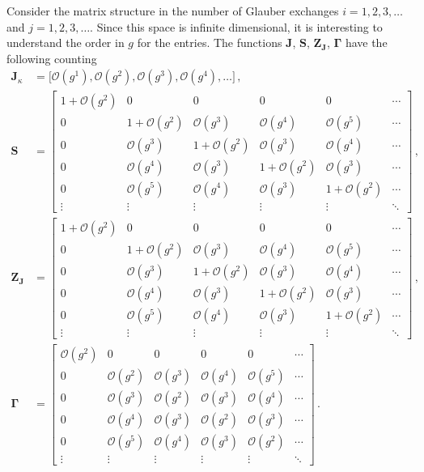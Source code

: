 \documentclass[letterpaper,11pt]{article}
\newcommand{\gs}{g}
\newcommand{\cO}{\mathcal{O}}
\begin{document}
Consider the matrix structure in the number of Glauber exchanges $i=1,2,3,\ldots$ and $j=1,2,3,\ldots$. Since this space is infinite dimensional, it is interesting to understand the order in $\gs$ for the entries. The functions $\mathbf{J}$, $\mathbf{S}$, $\mathbf{Z_J}$, $\mathbf{\Gamma}$ have the following counting 
\begin{align}\label{eq:J_gs_order}
  \mathbf{J}_\kappa &= \bigl[\cO(\gs^1),\cO(\gs^2), \cO(\gs^3), \cO(\gs^4),\dots \bigr]\,,\\
  \mathbf{S} &= \begin{bmatrix}
    1+\cO(\gs^2) & 0 & 0 & 0 & 0 & \cdots \\
    0 & 1+\cO(\gs^2) & \cO(\gs^3) & \cO(\gs^4) &\cO(\gs^5) &\cdots \\
    0 & \cO(\gs^3) & 1+\cO(\gs^2) & \cO(\gs^3) &\cO(\gs^4) &\cdots \\
    0 & \cO(\gs^4) & \cO(\gs^3) & 1+\cO(\gs^2) &\cO(\gs^3) &\cdots \\
    0 & \cO(\gs^5) & \cO(\gs^4) & \cO(\gs^3) &1+\cO(\gs^2) &\cdots  \\
    \vdots &  \vdots &\vdots&\vdots&\vdots&\ddots 
    \end{bmatrix}
  \,,  \\
  \label{eq:Z_gs_order}
  \mathbf{Z_J} &= \begin{bmatrix}
    1+\cO(\gs^2) & 0 & 0 & 0 & 0 & \cdots \\
    0 & 1+\cO(\gs^2) & \cO(\gs^3) & \cO(\gs^4) &\cO(\gs^5) &\cdots \\
    0 & \cO(\gs^3) & 1+\cO(\gs^2) & \cO(\gs^3) &\cO(\gs^4) &\cdots \\
    0 & \cO(\gs^4) & \cO(\gs^3) & 1+\cO(\gs^2) &\cO(\gs^3) &\cdots \\
    0 & \cO(\gs^5) & \cO(\gs^4) & \cO(\gs^3) &1+\cO(\gs^2) &\cdots  \\
   \vdots &  \vdots &\vdots&\vdots&\vdots&\ddots 
    \end{bmatrix}
    \,, \\
    \label{eq:Gamma_gs_order}
    \mathbf{\Gamma} &= \begin{bmatrix}
      \cO(\gs^2) & 0 & 0 & 0 & 0 & \cdots \\
      0 & \cO(\gs^2) & \cO(\gs^3) & \cO(\gs^4) &\cO(\gs^5) &\cdots \\
      0 & \cO(\gs^3) & \cO(\gs^2) & \cO(\gs^3) &\cO(\gs^4) &\cdots \\
      0 & \cO(\gs^4) & \cO(\gs^3) & \cO(\gs^2) &\cO(\gs^3) &\cdots \\
      0 & \cO(\gs^5) & \cO(\gs^4) & \cO(\gs^3) &\cO(\gs^2) &\cdots  \\
   \vdots &  \vdots &\vdots&\vdots&\vdots&\ddots 
      \end{bmatrix}
      \,. 
\end{align}
\end{document}
